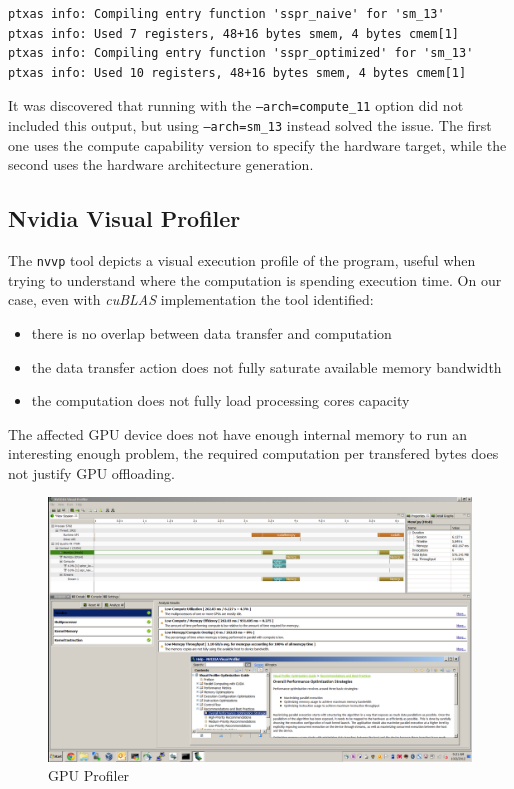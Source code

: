 \documentclass{llncs}
\begin{document}
\begin{verbatim}
ptxas info: Compiling entry function 'sspr_naive' for 'sm_13'
ptxas info: Used 7 registers, 48+16 bytes smem, 4 bytes cmem[1]
ptxas info: Compiling entry function 'sspr_optimized' for 'sm_13'
ptxas info: Used 10 registers, 48+16 bytes smem, 4 bytes cmem[1]
\end{verbatim}

It was discovered that running with the {\tt --arch=compute\_11} option did not included this output,
but using {\tt --arch=sm\_13} instead solved the issue. The first one uses the compute capability version to specify the hardware target, while the second uses the hardware architecture generation.

\subsection{Nvidia Visual Profiler}

The {\tt nvvp} tool depicts a visual execution profile of the program, useful when trying to understand where the computation is spending execution time. On our case, even with {\it cuBLAS} implementation the tool identified:

\begin{itemize}
\item there is no overlap between data transfer and computation
\item the data transfer action does not fully saturate available memory bandwidth
\item the computation does not fully load processing cores capacity
\end{itemize}

The affected GPU device does not have enough internal memory to run an interesting enough problem,
the required computation per transfered bytes does not justify GPU offloading.

\begin{figure}[H]
\begin{center}
\includegraphics[scale=0.25]{profiler.png}
\caption{GPU Profiler}
\label{fig:profiler}
\end{center}
\end{figure}
\end{document}
